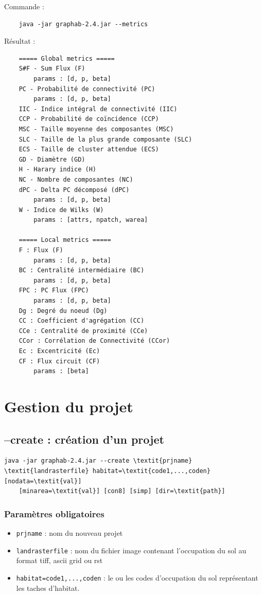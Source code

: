 \documentclass[a4paper,10pt]{report}
\begin{document}
Commande :
\begin{Verbatim}
	java -jar graphab-2.4.jar --metrics
\end{Verbatim}
Résultat :
\begin{Verbatim}
	===== Global metrics =====
	S#F - Sum Flux (F)
		params : [d, p, beta]
	PC - Probabilité de connectivité (PC)
		params : [d, p, beta]
	IIC - Indice intégral de connectivité (IIC)
	CCP - Probabilité de coïncidence (CCP)
	MSC - Taille moyenne des composantes (MSC)
	SLC - Taille de la plus grande composante (SLC)
	ECS - Taille de cluster attendue (ECS)
	GD - Diamètre (GD)
	H - Harary indice (H)
	NC - Nombre de composantes (NC)
	dPC - Delta PC décomposé (dPC)
		params : [d, p, beta]
	W - Indice de Wilks (W)
		params : [attrs, npatch, warea]
	
	===== Local metrics =====
	F : Flux (F)
		params : [d, p, beta]
	BC : Centralité intermédiaire (BC)
		params : [d, p, beta]
	FPC : PC Flux (FPC)
		params : [d, p, beta]
	Dg : Degré du noeud (Dg)
	CC : Coefficient d'agrégation (CC)
	CCe : Centralité de proximité (CCe)
	CCor : Corrélation de Connectivité (CCor)
	Ec : Excentricité (Ec)
	CF : Flux circuit (CF)
		params : [beta]

\end{Verbatim}

\section{Gestion du projet}

\subsection{--create : création d'un projet}

\begin{Verbatim}[commandchars=\\\{\}]
java -jar graphab-2.4.jar --create \textit{prjname} \textit{landrasterfile} habitat=\textit{code1,...,coden} [nodata=\textit{val}] 
	[minarea=\textit{val}] [con8] [simp] [dir=\textit{path}]
\end{Verbatim}

\subsubsection{Paramètres obligatoires}
\begin{itemize}
	\item \verb|prjname| : nom du nouveau projet
	\item \verb|landrasterfile| : nom du fichier image contenant l'occupation du sol au format tiff, ascii grid ou rst
	\item \verb|habitat=code1,...,coden| : le ou les codes d'occupation du sol représentant les taches d'habitat.
\end{itemize}
\end{document}

